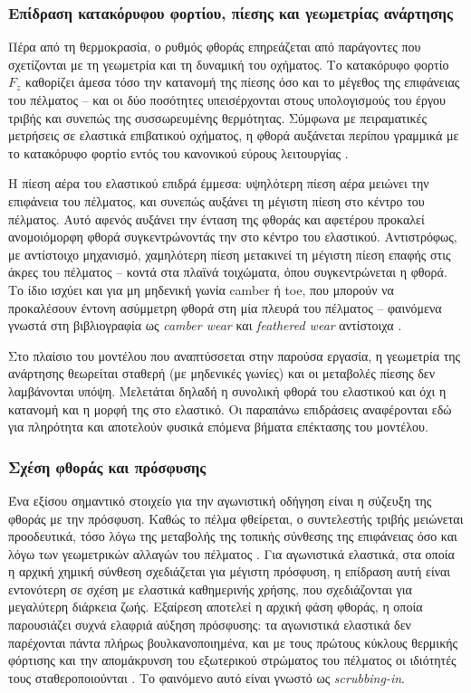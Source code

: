 \subsubsection{Επίδραση κατακόρυφου φορτίου, πίεσης και γεωμετρίας ανάρτησης}
\label{subsubsec:wear_secondary}

Πέρα από τη θερμοκρασία, ο ρυθμός φθοράς επηρεάζεται από παράγοντες που σχετίζονται με τη
γεωμετρία και τη δυναμική του οχήματος. Το κατακόρυφο φορτίο $F_z$ καθορίζει άμεσα τόσο
την κατανομή της πίεσης όσο και το μέγεθος της επιφάνειας του πέλματος -- και οι δύο ποσότητες υπεισέρχονται
στους υπολογισμούς του έργου τριβής και συνεπώς της συσσωρευμένης θερμότητας. Σύμφωνα με
πειραματικές μετρήσεις σε ελαστικά επιβατικού οχήματος, η φθορά αυξάνεται περίπου γραμμικά
με το κατακόρυφο φορτίο εντός του κανονικού εύρους λειτουργίας \cite{WangKTH2017}.

Η πίεση αέρα του ελαστικού επιδρά έμμεσα: υψηλότερη πίεση αέρα μειώνει την επιφάνεια του πέλματος,
και συνεπώς αυξάνει τη μέγιστη πίεση στο κέντρο του πέλματος. Αυτό αφενός αυξάνει την ένταση της
φθοράς και αφετέρου προκαλεί ανομοιόμορφη φθορά συγκεντρώνοντάς την στο κέντρο του ελαστικού.
Αντιστρόφως, με αντίστοιχο μηχανισμό, χαμηλότερη πίεση μετακινεί τη μέγιστη πίεση επαφής
στις άκρες του πέλματος -- κοντά στα πλαϊνά τοιχώματα, όπου συγκεντρώνεται η φθορά. Το ίδιο ισχύει
και για μη μηδενική γωνία camber ή toe, που μπορούν να προκαλέσουν έντονη
ασύμμετρη φθορά στη μία πλευρά του πέλματος -- φαινόμενα γνωστά στη βιβλιογραφία ως
\emph{camber wear} και \emph{feathered wear} αντίστοιχα \cite{WangKTH2017}.

Στο πλαίσιο του μοντέλου που αναπτύσσεται στην παρούσα εργασία, η γεωμετρία της ανάρτησης
θεωρείται σταθερή (με μηδενικές γωνίες) και οι μεταβολές πίεσης δεν λαμβάνονται υπόψη.
Μελετάται δηλαδή η συνολική φθορά του ελαστικού και όχι η κατανομή και η μορφή της στο ελαστικό.
Οι παραπάνω επιδράσεις αναφέρονται εδώ για πληρότητα και αποτελούν φυσικά επόμενα βήματα επέκτασης του
μοντέλου.

\subsubsection{Σχέση φθοράς και πρόσφυσης}
\label{subsubsec:wear_grip_coupling}

Ένα εξίσου σημαντικό στοιχείο για την αγωνιστική οδήγηση είναι η σύζευξη της φθοράς με
την πρόσφυση. Καθώς το πέλμα φθείρεται, ο συντελεστής τριβής μειώνεται προοδευτικά,
τόσο λόγω της μεταβολής της τοπικής σύνθεσης της επιφάνειας όσο και λόγω των γεωμετρικών
αλλαγών του πέλματος \cite{West2022,Tremlett2016}. Για αγωνιστικά ελαστικά, στα οποία η
αρχική χημική σύνθεση σχεδιάζεται για μέγιστη πρόσφυση, η επίδραση αυτή είναι εντονότερη σε
σχέση με ελαστικά καθημερινής χρήσης, που σχεδιάζονται για μεγαλύτερη διάρκεια ζωής.
Εξαίρεση αποτελεί η αρχική φάση φθοράς, η οποία παρουσιάζει συχνά ελαφριά αύξηση
πρόσφυσης: τα αγωνιστικά ελαστικά δεν παρέχονται πάντα πλήρως βουλκανοποιημένα, και με τους
πρώτους κύκλους θερμικής φόρτισης και την απομάκρυνση του εξωτερικού στρώματος του πέλματος
οι ιδιότητές τους σταθεροποιούνται \cite{West2022}. Το φαινόμενο αυτό είναι γνωστό ως \emph{scrubbing-in}.

